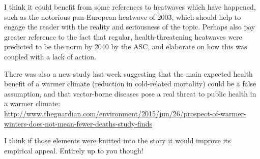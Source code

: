 I think it could benefit from some references to heatwaves which have happened, such as the notorious pan-European heatwave of 2003, which should help to engage the reader with the reality and seriousness of the topic. Perhaps also pay greater reference to the fact that regular, health-threatening heatwaves were predicted to be the norm by 2040 by the ASC, and elaborate on how this was coupled with a lack of action.
 
There was also a new study last week suggesting that the main expected health benefit of a warmer climate (reduction in cold-related mortality) could be a false assumption, and that vector-borne diseases pose a real threat to public health in a warmer climate:
\url{http://www.theguardian.com/environment/2015/jun/26/prospect-of-warmer-winters-does-not-mean-fewer-deaths-study-finds}
 
I think if those elements were knitted into the story it would improve its empirical appeal. Entirely up to you though!